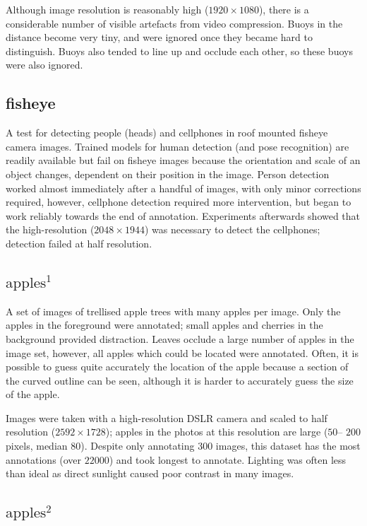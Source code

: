 Although image resolution is reasonably high ($1920\times1080$), there is a considerable number of visible artefacts from video compression. Buoys in the distance become very tiny, and were ignored once they became hard to distinguish. Buoys also tended to line up and occlude each other, so these buoys were also ignored.


\subsection{fisheye}
    
A test for detecting people (heads) and cellphones in roof mounted fisheye camera images. Trained models for human detection (and pose recognition) are readily available but fail on fisheye images because the orientation and scale of an object changes, dependent on their position in the image. Person detection worked almost immediately after a handful of images, with only minor corrections required, however, cellphone detection required more intervention, but began to work reliably towards the end of annotation. Experiments afterwards showed that the high-resolution ($2048\times1944$) was necessary to detect the cellphones; detection failed at half resolution.

\subsection{$\mathrm{apples^1}$}

A set of images of trellised apple trees with many apples per image. Only the apples in the foreground were annotated; small apples and cherries in the background provided distraction. Leaves occlude a large number of apples in the image set, however, all apples which could be located were annotated. Often, it is possible to guess quite accurately the location of the apple because a section of the curved outline can be seen, although it is harder to accurately guess the size of the apple. 

Images were taken with a high-resolution DSLR camera and scaled to half resolution ($2592\times1728$); apples in the photos at this resolution are large ($50$-- $200$ pixels, median $80$). Despite only annotating 300 images, this dataset has the most annotations (over $22000$) and took longest to annotate. Lighting was often less than ideal as direct sunlight caused poor contrast in many images.
    
\subsection{$\mathrm{apples^2}$}
    
